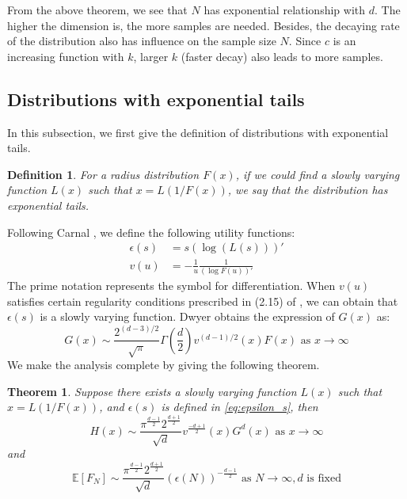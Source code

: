 \documentclass[conference,a4paper]{IEEEtran}
\def\E{\mathbb{E}}
\newtheorem{definition}{Definition}
\newtheorem{theorem}{Theorem}
\begin{document}
From the above theorem, we see that $N$ has exponential relationship with $d$.
The higher the dimension is, the more samples are needed.
Besides, the decaying rate of the distribution also has influence on the sample size $N$.
Since $c$ is an increasing function with $k$,
larger $k$ (faster decay) also leads to more samples.

\subsection{Distributions with exponential tails}
In this subsection, we first give the definition of distributions with exponential tails.
\begin{definition}
  For a radius distribution $F(x)$, if we could find
  a slowly varying function $L(x)$ such that
  $x = L(1/F(x))$, we say that the distribution has exponential tails.
\end{definition}
Following Carnal \cite{carnal1970konvexe},
we define the following utility functions:
\begin{align}
     \epsilon(s) & = s (\log (L(s)))' \label{eq:epsilon_s}\\
     v(u) &= -\frac{1}{u} \frac{1}{(\log F(u))'}    
\end{align}
The prime notation represents the symbol for differentiation. When $v(u)$ satisfies
certain regularity conditions prescribed in (2.15) of \cite{carnal1970konvexe},
we can obtain that $\epsilon(s)$ is a slowly varying function.
Dwyer \cite{dwyer1991convex} obtains the expression of $G(x)$ as:
\begin{equation}\label{eq:G_x_exp}
     G(x) \sim \frac{2^{(d-3)/2}}{\sqrt{\pi}}\Gamma\left(\frac{d}{2}\right)
     v^{(d-1)/2}(x) F(x)
      \textrm{ as } x\to \infty
\end{equation}
We make the analysis complete by giving the following theorem.
\begin{theorem}\label{thm:exponential_tails}
     Suppose there exists a slowly
     varying function $L(x)$ such that \linebreak $x=L(1/F(x))$,
     and $\epsilon(s)$ is defined in \eqref{eq:epsilon_s}, then
\begin{equation}\label{eq:H_x_exp}
     H(x) \sim \frac{\pi^{\frac{d-1}{2}} 2^{\frac{d+1}{2}}}{\sqrt{d}}v^{\frac{-d+1}{2}}(x)G^d(x)
     \textrm{ as } x\to \infty
\end{equation}
 and
 \begin{equation}\label{eq:exp_e_f_n}
     \E[F_N]\sim \frac{\pi^{\frac{d-1}{2}} 2^{\frac{d+1}{2}}}{\sqrt{d}} (\epsilon(N))^{-\frac{d-1}{2}}
     \textrm{ as } N \to \infty, d \textrm { is fixed}
 \end{equation}
\end{theorem}
\end{document}

